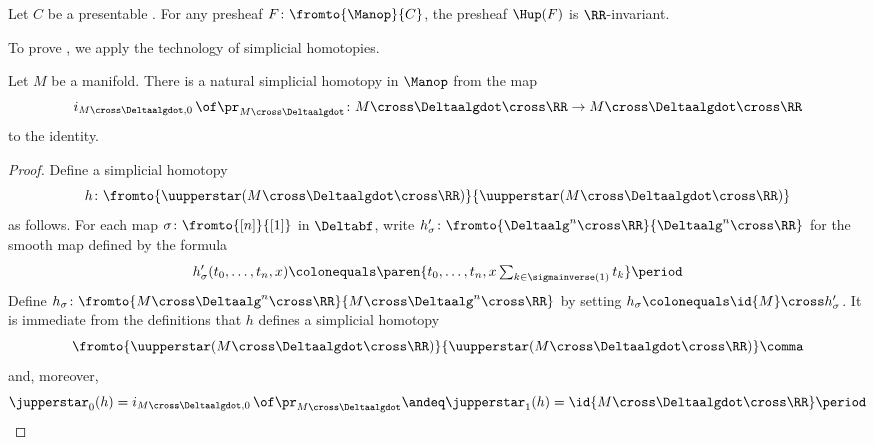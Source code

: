 \begin{lemma}\label{lem:Hishi}
	Let $ C $ be a presentable \category.
	For any presheaf $ F \colon \fromto{\Manop}{C} $, the presheaf $ \Hup(F) $ is $ \RR $-invariant.
\end{lemma}

\noindent To prove , we apply the technology of simplicial homotopies.

\begin{lemma}\label{lem:simplicialhomotopyindpr}
	Let $ M $ be a manifold.
	There is a natural simplicial homotopy in $ \Manop $ from the map
	\begin{equation*}
		i_{M \cross \Deltaalgdot,0}\, \of \pr_{M \cross \Deltaalgdot} \colon M \cross \Deltaalgdot \cross \RR \to M \cross \Deltaalgdot \cross \RR
	\end{equation*}
	to the identity.
\end{lemma}

\begin{proof}
	Define a simplicial homotopy
	\begin{equation*}
		h \colon \fromto{\uupperstar(M \cross \Deltaalgdot \cross \RR)}{\uupperstar(M \cross \Deltaalgdot \cross \RR)}
	\end{equation*}
	as follows.
	For each map $ \sigma \colon \fromto{[n]}{[1]} $ in $ \Deltabf $, write $ h'_{\sigma} \colon \fromto{\Deltaalg^n \cross \RR}{\Deltaalg^n \cross \RR} $ for the smooth map defined by the formula
	\begin{equation*}
		h'_{\sigma}(t_0,\ldots,t_n,x) \colonequals \paren{t_0,\ldots,t_n, \textstyle x\sum_{k \in \sigmainverse(1)} t_k} \period
	\end{equation*}
	Define $ h_{\sigma} \colon \fromto{M \cross \Deltaalg^n \cross \RR}{M \cross \Deltaalg^n \cross \RR} $ by setting $ h_{\sigma} \colonequals \id{M} \cross h'_{\sigma} $.
	It is immediate from the definitions that $ h $ defines a simplicial homotopy
	\begin{equation*}
		\fromto{\uupperstar(M \cross \Deltaalgdot \cross \RR)}{\uupperstar(M \cross \Deltaalgdot \cross \RR)} \comma
	\end{equation*}
	and, moreover,
	\begin{equation*}
		\jupperstar_0(h) = i_{M \cross \Deltaalgdot,0}\, \of \pr_{M \cross \Deltaalgdot} \andeq \jupperstar_1(h) = \id{M \cross \Deltaalgdot \cross \RR} \period \qedhere
	\end{equation*}
\end{proof}

